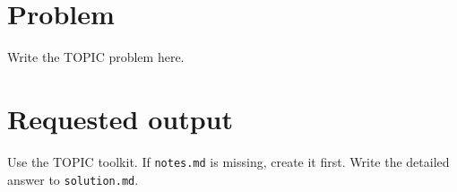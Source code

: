\documentclass{article}
\begin{document}
\section*{Problem}

Write the {{TOPIC}} problem here.

\section*{Requested output}

Use the {{TOPIC}} toolkit. If \texttt{notes.md} is missing, create it first.
Write the detailed answer to \texttt{solution.md}.
\end{document}
